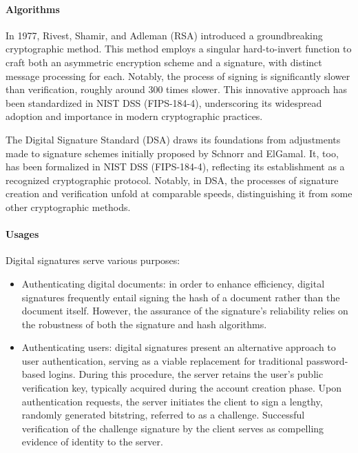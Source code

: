 \paragraph*{Algorithms}
In 1977, Rivest, Shamir, and Adleman (RSA) introduced a groundbreaking cryptographic method. 
This method employs a singular hard-to-invert function to craft both an asymmetric encryption scheme and a signature, with distinct message processing for each. 
Notably, the process of signing is significantly slower than verification, roughly around 300 times slower. 
This innovative approach has been standardized in NIST DSS (FIPS-184-4), underscoring its widespread adoption and importance in modern cryptographic practices.

The Digital Signature Standard (DSA) draws its foundations from adjustments made to signature schemes initially proposed by Schnorr and ElGamal. 
It, too, has been formalized in NIST DSS (FIPS-184-4), reflecting its establishment as a recognized cryptographic protocol. 
Notably, in DSA, the processes of signature creation and verification unfold at comparable speeds, distinguishing it from some other cryptographic methods.

\paragraph*{Usages}
Digital signatures serve various purposes:
\begin{itemize}
    \item Authenticating digital documents: in order to enhance efficiency, digital signatures frequently entail signing the hash of a document rather than the document itself. 
        However, the assurance of the signature's reliability relies on the robustness of both the signature and hash algorithms.
    \item Authenticating users: digital signatures present an alternative approach to user authentication, serving as a viable replacement for traditional password-based logins. 
        During this procedure, the server retains the user's public verification key, typically acquired during the account creation phase. 
        Upon authentication requests, the server initiates the client to sign a lengthy, randomly generated bitstring, referred to as a challenge. 
        Successful verification of the challenge signature by the client serves as compelling evidence of identity to the server.
\end{itemize}
